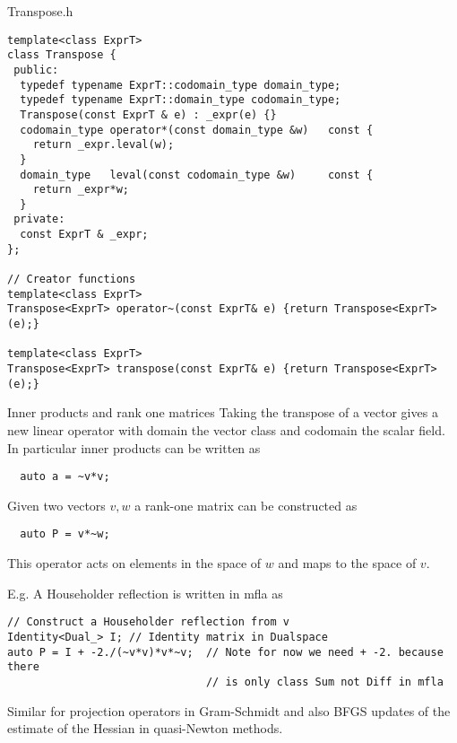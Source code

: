 \documentclass[9pt]{beamer}
\begin{document}
\begin{frame}[fragile]{Transpose.h}
\begin{lstlisting}
template<class ExprT>
class Transpose {
 public:
  typedef typename ExprT::codomain_type domain_type;
  typedef typename ExprT::domain_type codomain_type;
  Transpose(const ExprT & e) : _expr(e) {}
  codomain_type operator*(const domain_type &w)   const {
    return _expr.leval(w);
  }
  domain_type   leval(const codomain_type &w)     const {
    return _expr*w;
  }
 private:
  const ExprT & _expr;
};

// Creator functions
template<class ExprT>
Transpose<ExprT> operator~(const ExprT& e) {return Transpose<ExprT>(e);}

template<class ExprT>
Transpose<ExprT> transpose(const ExprT& e) {return Transpose<ExprT>(e);}
\end{lstlisting}
\end{frame}


\begin{frame}[fragile]{Inner products and rank one matrices}
Taking the transpose of a vector gives a new linear operator with domain the vector class and codomain the scalar field.
In particular inner products can be written as

\begin{lstlisting}
  auto a = ~v*v;
\end{lstlisting}
Given two vectors $v,w$ a rank-one matrix can be constructed as

\begin{lstlisting}
  auto P = v*~w;
\end{lstlisting}
This operator acts on elements in the space of $w$ and maps to the space of $v$.
\pause

E.g. A Householder reflection is written in mfla as

\begin{lstlisting}
// Construct a Householder reflection from v
Identity<Dual_> I; // Identity matrix in Dualspace
auto P = I + -2./(~v*v)*v*~v;  // Note for now we need + -2. because there
                               // is only class Sum not Diff in mfla
\end{lstlisting}

Similar for projection operators in Gram-Schmidt and also BFGS updates of the estimate of the Hessian in quasi-Newton methods.



\end{frame}
\end{document}
